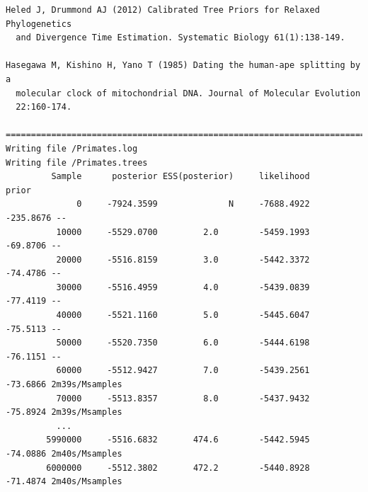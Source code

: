 \documentclass[11pt]{article}
\theoremstyle{plain}%
\theoremstyle{definition}
\theoremstyle{remark}
\begin{document}
{\begin{verbatim}
Heled J, Drummond AJ (2012) Calibrated Tree Priors for Relaxed Phylogenetics
  and Divergence Time Estimation. Systematic Biology 61(1):138-149.

Hasegawa M, Kishino H, Yano T (1985) Dating the human-ape splitting by a
  molecular clock of mitochondrial DNA. Journal of Molecular Evolution
  22:160-174.

===============================================================================
Writing file /Primates.log
Writing file /Primates.trees
         Sample      posterior ESS(posterior)     likelihood          prior
              0     -7924.3599              N     -7688.4922      -235.8676 --
          10000     -5529.0700         2.0        -5459.1993       -69.8706 --
          20000     -5516.8159         3.0        -5442.3372       -74.4786 --
          30000     -5516.4959         4.0        -5439.0839       -77.4119 --
          40000     -5521.1160         5.0        -5445.6047       -75.5113 --
          50000     -5520.7350         6.0        -5444.6198       -76.1151 --
          60000     -5512.9427         7.0        -5439.2561       -73.6866 2m39s/Msamples
          70000     -5513.8357         8.0        -5437.9432       -75.8924 2m39s/Msamples
          ...
        5990000     -5516.6832       474.6        -5442.5945       -74.0886 2m40s/Msamples
        6000000     -5512.3802       472.2        -5440.8928       -71.4874 2m40s/Msamples


\end{verbatim}}
\end{document}
